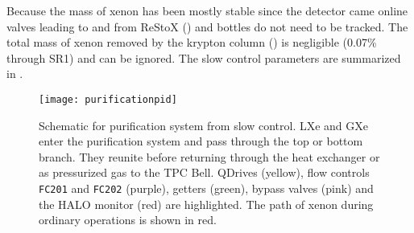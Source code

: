 Because the mass of xenon has been mostly stable since the detector came online valves
leading to and from ReStoX () and bottles do not need to be tracked.  The total mass of xenon removed by the
krypton column () is negligible (0.07\% through SR1) and
can be ignored.  The slow control parameters are summarized in .

\begin{table}
\centering
{}
\caption{Parameters queried from the slow control system to calculate $F_{\mathrm{G}}$ and $F_{\mathrm{L}}$.  Those in
 are highlighted in the color listed.}
\label{tab:electron_lifetime_model_removal_slow_control_pars}
\end{table}

\begin{figure}
\centering
\texttt{[image: purificationpid]}
\caption[Schematic for purification system from slow control.]{Schematic for purification system from slow control.  LXe and GXe enter the
purification system and pass through the top or
bottom branch.  They reunite before returning through the heat exchanger or as pressurized gas to the TPC Bell.  QDrives (yellow),
flow controls \texttt{FC201} and \texttt{FC202} (purple), getters (green), bypass valves (pink) and the HALO monitor (red) are
highlighted.  The path of xenon during ordinary operations is shown in red.}
\label{fig:electron_lifetime_model_slow_control_pur}
\end{figure}


